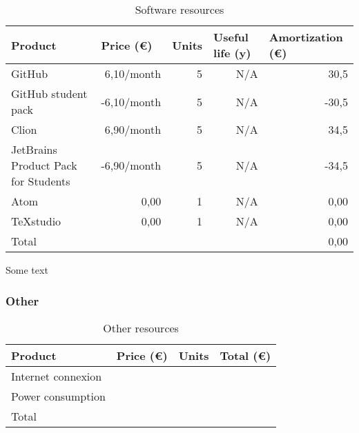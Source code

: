 \begin{table}[h!]
	\centering
	\begin{tabular}{|l|r|r|r|r|}
		\hline
		Product              & \multicolumn{1}{l|}{Price (€)} & \multicolumn{1}{l|}{Units} & \multicolumn{1}{l|}{Useful life (y)} & \multicolumn{1}{l|}{Amortization (€)} \\ \hline
		GitHub	& 6,10/month & 5 & N/A & 30,5 \\ \hline
		GitHub student pack & -6,10/month & 5 & N/A & -30,5 \\ \hline
		Clion 	& 6,90/month & 5 & N/A & 34,5 \\ \hline
		JetBrains Product Pack for Students & -6,90/month & 5 & N/A & -34,5 \\ \hline
		Atom 	& 0,00 & 1 & N/A & 0,00 \\ \hline
		TeXstudio 	& 0,00 & 1 & N/A & 0,00 \\ \hline\hline
		Total	& \multicolumn{4}{r|}{0,00}                                                                                           \\ \hline
	\end{tabular}
	\caption{Software resources}
	\label{SoftwareResources}
\end{table}

Some text
\subsubsection{Other}

\begin{table}[h!]
	\centering
	\begin{tabular}{|l|r|r|r|}
		\hline
		\multicolumn{1}{|l|}{Product} & \multicolumn{1}{l|}{Price (€)} & \multicolumn{1}{l|}{Units} & \multicolumn{1}{l|}{Total (€)} \\ \hline
		Internet connexion & & & \\ \hline
		Power consumption & & & \\ \hline\hline
		Total & \multicolumn{3}{r|}{}                                                                        \\ \hline
	\end{tabular}
	\caption{Other resources}
	\label{OtherResources}
\end{table}

